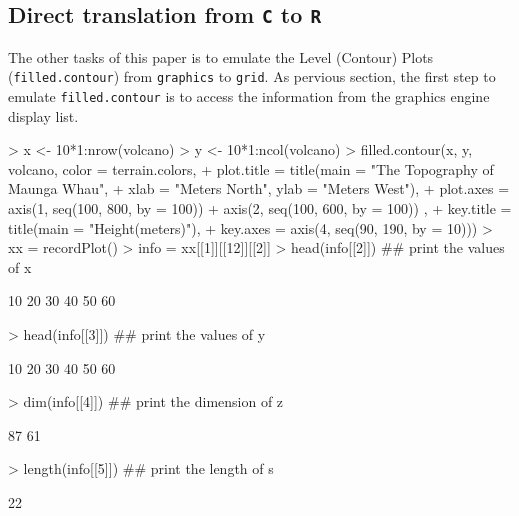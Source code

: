 \documentclass[paper=a4, fontsize=11pt]{report}
\begin{document}
\subsection{Direct translation from \texttt{C} to \texttt{R}}
The other tasks of this paper is to emulate the Level (Contour) Plots (\texttt{filled.contour}) from \texttt{graphics} to \texttt{grid}. As pervious section, the first step to emulate \texttt{filled.contour} is to access the information from the graphics engine display list.
\begin{Schunk}
\begin{Sinput}
> x <- 10*1:nrow(volcano)
> y <- 10*1:ncol(volcano)
> filled.contour(x, y, volcano, color = terrain.colors,
+     plot.title = title(main = "The Topography of Maunga Whau",
+     xlab = "Meters North", ylab = "Meters West"),
+     plot.axes = { axis(1, seq(100, 800, by = 100))
+                   axis(2, seq(100, 600, by = 100)) },
+     key.title = title(main = "Height\n(meters)"),
+     key.axes = axis(4, seq(90, 190, by = 10)))
> xx = recordPlot()
> info = xx[[1]][[12]][[2]]
> head(info[[2]])  ## print the values of x
\end{Sinput}
\begin{Soutput}
[1] 10 20 30 40 50 60
\end{Soutput}
\begin{Sinput}
> head(info[[3]])  ## print the values of y
\end{Sinput}
\begin{Soutput}
[1] 10 20 30 40 50 60
\end{Soutput}
\begin{Sinput}
> dim(info[[4]])  ## print the dimension of z
\end{Sinput}
\begin{Soutput}
[1] 87 61
\end{Soutput}
\begin{Sinput}
> length(info[[5]])  ## print the length of s
\end{Sinput}
\begin{Soutput}
[1] 22
\end{Soutput}
\end{Schunk}
\end{document}
